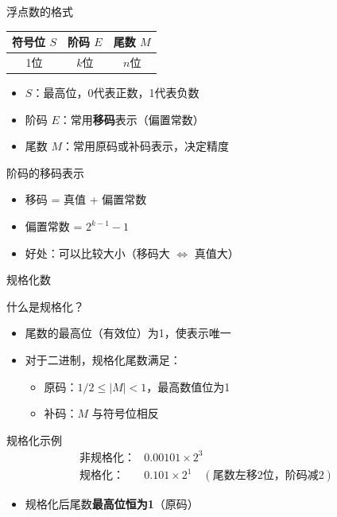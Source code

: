 \documentclass[10pt, aspectratio=169]{beamer}
\begin{document}
\begin{frame}{浮点数的格式}
    \begin{center}
        \begin{tabular}{|c|c|c|}
            \hline
            \textbf{符号位 $S$} & \textbf{阶码 $E$} & \textbf{尾数 $M$} \\
            \hline
            1位 & $k$位 & $n$位 \\
            \hline
        \end{tabular}
    \end{center}
    \vspace{0.5em}
    \begin{itemize}
        \item $S$：最高位，0代表正数，1代表负数
        \item 阶码 $E$：常用\textbf{移码}表示（偏置常数）
        \item 尾数 $M$：常用原码或补码表示，决定精度
    \end{itemize}
    \vspace{0.5em}
    \begin{block}{阶码的移码表示}
        \begin{itemize}
            \item 移码 = 真值 + 偏置常数
            \item 偏置常数 = $2^{k-1} - 1$
            \item 好处：可以比较大小（移码大 $\Leftrightarrow$ 真值大）
        \end{itemize}
    \end{block}
\end{frame}

\begin{frame}{规格化数}
    \begin{block}{什么是规格化？}
        \begin{itemize}
            \item 尾数的最高位（有效位）为1，使表示唯一
            \item 对于二进制，规格化尾数满足：
            \begin{itemize}
                \item 原码：$1/2 \le |M| < 1$，最高数值位为1
                \item 补码：$M$ 与符号位相反
            \end{itemize}
        \end{itemize}
    \end{block}
    \vspace{0.3em}
    \begin{exampleblock}{规格化示例}
        \begin{align*}
            \text{非规格化：} & 0.00101 \times 2^3 \\
            \text{规格化：} & 0.101 \times 2^1 \quad (\text{尾数左移2位，阶码减2})
        \end{align*}
    \end{exampleblock}
    \vspace{0.3em}
    \begin{itemize}
        \item 规格化后尾数\textbf{最高位恒为1}（原码）
    \end{itemize}
\end{frame}
\end{document}
